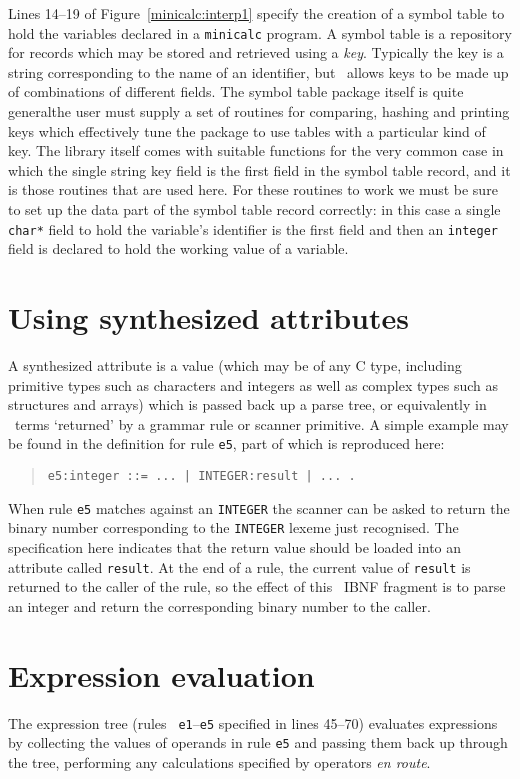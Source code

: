 Lines 14--19 of Figure~\ref{minicalc:interp1}  specify the creation of a
symbol table to hold the variables declared in a {\tt minicalc} program.
A symbol table is a repository for records which may be stored and
retrieved using a {\em key}. Typically the key is a string corresponding
to the name of an identifier, but \rdp\ allows keys to be made up of
combinations of different fields. The symbol table package itself is
quite general\dash the user must supply a set of routines for comparing,
hashing and printing keys which effectively tune the package to use
tables with a particular kind of key. The library itself comes with
suitable functions for the very common  case in which the single string
key field is the first field in the  symbol table record, and it is
those routines that are used here. For these routines to work we must be
sure to set up the data part of the symbol table record correctly: in
this case a single {\tt char*} field to hold the variable's identifier
is the first field and then an {\tt integer} field is declared to hold
the working value of a variable.

\section{Using synthesized attributes}
A synthesized attribute is a value (which may be of any C type, including primitive types
such as characters and integers as well as complex types such as structures and arrays) which
is passed back up a parse tree, or equivalently in \rdp\ terms `returned' by a grammar rule
or scanner primitive. A simple example may be found in the definition for rule {\tt e5}, part
of which is reproduced here:
\begin{quote}
\small
\begin{verbatim}
e5:integer ::= ... | INTEGER:result | ... .
\end{verbatim}
\end{quote}
When rule {\tt e5} matches against an {\tt INTEGER} the scanner can be asked to return the
binary number corresponding to the {\tt INTEGER} lexeme just recognised. The specification 
here indicates that the return value should be loaded into an attribute called {\tt result}.
At the end of a rule, the current value of {\tt result} is returned to the caller of the rule,
so the effect of this \rdp\ IBNF fragment is to parse an integer and return the corresponding
binary number to the caller.

\section{Expression evaluation} The expression tree (rules {\tt
e1}--{\tt e5} specified in lines 45--70) evaluates expressions by
collecting the values of operands in rule {\tt e5} and passing them back
up through the tree, performing any calculations specified by operators
{\em en route}. 

